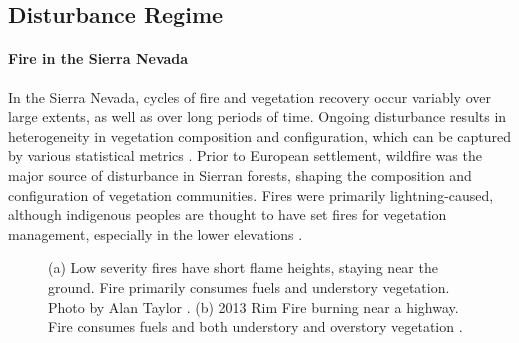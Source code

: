 
\subsection{Disturbance Regime}
\paragraph*{Fire in the Sierra Nevada}
In the Sierra Nevada, cycles of fire and vegetation recovery occur variably over large extents, as well as over long periods of time. Ongoing disturbance results in heterogeneity in vegetation composition and configuration, which can be captured by various statistical metrics \citep{Monica2008}. Prior to European settlement, wildfire was the major source of disturbance in Sierran forests, shaping the composition and configuration of vegetation communities. Fires were primarily lightning-caused, although indigenous peoples are thought to have set fires for vegetation management, especially in the lower elevations \citep{Anderson1996}. 

\begin{figure}[!htbp]
  \centering
   \caption{(a) Low severity fires have short flame heights, staying near the ground. Fire primarily consumes fuels and understory vegetation. Photo by Alan Taylor \citep{lowseverityfirephoto}. (b) 2013 Rim Fire burning near a highway. Fire consumes fuels and both understory and overstory vegetation \citep{highseverityphoto}.} 
\label{figs:fireseverity}
\end{figure}

